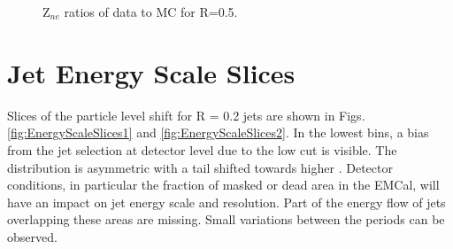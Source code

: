 \begin{figure}[h!]
    \qquad
    \caption{Z$_{ne}$ ratios of data to MC for R=0.5.}
    \label{fig:TriggerBiasRatiosZneR05pPb}
\end{figure}

\newpage

\section{Jet Energy Scale Slices}
\label{sec:AppendixJES}

Slices of the particle level \pT shift for R = 0.2 jets are shown in Figs. \ref{fig:EnergyScaleSlices1} and \ref{fig:EnergyScaleSlices2}. In the lowest bins, a bias from the jet selection at detector level due to the low \pT cut is visible. The distribution is asymmetric with a tail shifted towards higher \pT. Detector conditions, in particular the fraction of masked or dead area in the EMCal, will have an impact on jet energy scale and resolution. Part of the energy flow of jets overlapping these areas are missing. Small variations between the periods can be observed.

\newpage

